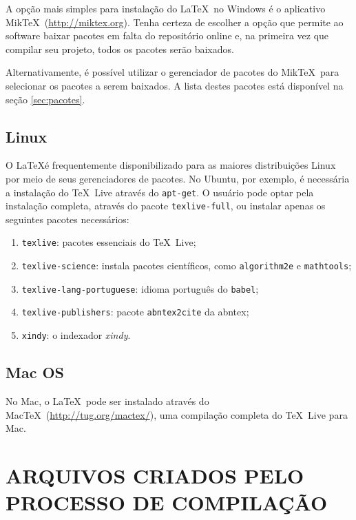 \documentclass[xindy,rascunho]{fei}
\begin{document}
\begin{teorema}
	A opção mais simples para instalação do \LaTeX\ no Windows é o aplicativo Mik\TeX\ (\url{http://miktex.org}). Tenha certeza de escolher a opção que permite ao software baixar pacotes em falta do repositório online e, na primeira vez que compilar seu projeto, todos os pacotes serão baixados.
	
	Alternativamente, é possível utilizar o gerenciador de pacotes do Mik\TeX\ para selecionar os pacotes a serem baixados. A lista destes pacotes está disponível na seção \ref{sec:pacotes}.
	
	\section{Linux}
	
	O \LaTeX é frequentemente disponibilizado para as maiores distribuições Linux por meio de seus gerenciadores de pacotes. No Ubuntu, por exemplo, é necessária a instalação do \TeX\ Live através do \texttt{apt-get}. O usuário pode optar pela instalação completa, através do pacote \texttt{texlive-full}, ou instalar apenas os seguintes pacotes necessários:
	
	\begin{enumerate}
	\item \texttt{texlive}: pacotes essenciais do \TeX\ Live;
	\item \texttt{texlive-science}: instala pacotes científicos, como \texttt{algorithm2e} e \texttt{mathtools};
	\item \texttt{texlive-lang-portuguese}: idioma português do \texttt{babel};
	\item \texttt{texlive-publishers}: pacote \texttt{abntex2cite} da \gls{abntex};
	\item {}\texttt{xindy}: o indexador \emph{xindy}.
	\end{enumerate}

	\section{Mac OS}
	
	No Mac, o \LaTeX\ pode ser instalado através do Mac\TeX\ (\url{http://tug.org/mactex/}), uma compilação completa do \TeX\ Live para Mac.

	
	\appendix
	
	\chapter{ARQUIVOS CRIADOS PELO PROCESSO DE COMPILAÇÃO}
	

\end{teorema}
\end{document}
